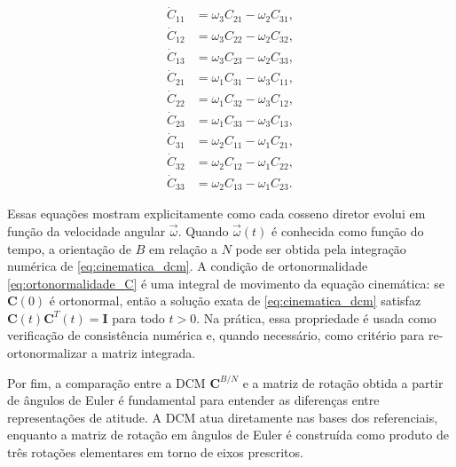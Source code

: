 \begin{equation}
\begin{aligned}
    \dot{C}_{11} &= \omega_3 C_{21} - \omega_2 C_{31}, \\
    \dot{C}_{12} &= \omega_3 C_{22} - \omega_2 C_{32}, \\
    \dot{C}_{13} &= \omega_3 C_{23} - \omega_2 C_{33}, \\
    \dot{C}_{21} &= \omega_1 C_{31} - \omega_3 C_{11}, \\
    \dot{C}_{22} &= \omega_1 C_{32} - \omega_3 C_{12}, \\
    \dot{C}_{23} &= \omega_1 C_{33} - \omega_3 C_{13}, \\
    \dot{C}_{31} &= \omega_2 C_{11} - \omega_1 C_{21}, \\
    \dot{C}_{32} &= \omega_2 C_{12} - \omega_1 C_{22}, \\
    \dot{C}_{33} &= \omega_2 C_{13} - \omega_1 C_{23}.
\end{aligned}
\end{equation}

Essas equações mostram explicitamente como cada cosseno diretor evolui em
função da velocidade angular $\vec{\omega}$.
Quando $\vec{\omega}(t)$ é conhecida como função do tempo, a orientação de $B$ em relação a $N$ pode ser obtida pela integração numérica de \eqref{eq:cinematica_dcm}.
A condição de ortonormalidade \eqref{eq:ortonormalidade_C} é uma integral de movimento da equação cinemática: se $\mathbf{C}(0)$ é ortonormal, então a solução exata de \eqref{eq:cinematica_dcm} satisfaz $\mathbf{C}(t)\mathbf{C}^{T}(t)=\mathbf{I}$ para todo $t>0$. Na prática, essa propriedade é usada como verificação de consistência numérica e, quando necessário, como critério para re-ortonormalizar a matriz integrada.

Por fim, a comparação entre a DCM $\mathbf{C}^{B/N}$ e a matriz de rotação obtida a partir de ângulos de Euler é fundamental para entender as diferenças entre representações de atitude. A DCM atua diretamente nas bases dos referenciais, enquanto a matriz de rotação em ângulos de Euler é construída como produto de três rotações elementares em torno de eixos prescritos.